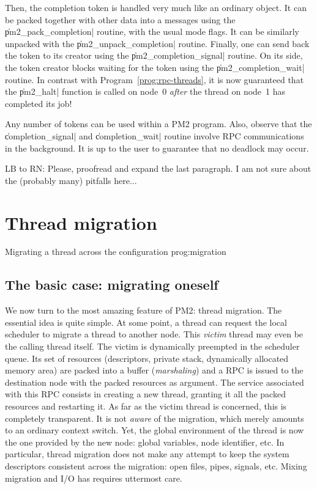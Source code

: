 Then, the completion token is handled very much like an ordinary
object. It can be packed together with other data into a messages
using the \|pm2_pack_completion| routine, with the usual mode flags.
It can be similarly unpacked with the \|pm2_unpack_completion|
routine.  Finally, one can send back the token to its creator using
the \|pm2_completion_signal| routine. On its side, the token creator
blocks waiting for the token using the \|pm2_completion_wait|
routine. In contrast with Program~\ref{prog:rpc-threads}, it is now
guaranteed that the \|pm2_halt| function is called on node~0
\emph{after} the thread on node~1 has completed its job!

Any number of tokens can be used within a PM2 program. Also, observe
that the \|completion_signal| and \|completion_wait| routine involve
RPC communications in the background. It is up to the user to
guarantee that no deadlock may occur.

\begin{note}
  LB to RN: Please, proofread and expand the last paragraph. I am not
  sure about the (probably many) pitfalls here...
\end{note}

\section{Thread migration}

 {Migrating a thread across the
  configuration} {prog:migration}

\subsection{The basic case: migrating oneself}
\label{sec:self-migration}

We now turn to the most amazing feature of PM2: thread migration. The
essential idea is quite simple. At some point, a thread can request
the local scheduler to migrate a thread to another node. This
\emph{victim} thread may even be the calling thread itself. The victim
is dynamically preempted in the scheduler queue. Its set of resources
(descriptors, private stack, dynamically allocated memory area) are
packed into a buffer (\emph{marshaling}) and a RPC is issued to the
destination node with the packed resources as argument.  The service
associated with this RPC consists in creating a new thread, granting
it all the packed resources and restarting it.  As far as the victim
thread is concerned, this is completely transparent.  It is not
\emph{aware} of the migration, which merely amounts to an ordinary
context switch.  Yet, the global environment of the thread is now the
one provided by the new node: global variables, node identifier, etc.
In particular, thread migration does not make any attempt to keep the
system descriptors consistent across the migration: open files, pipes,
signals, etc.  Mixing migration and I/O has requires uttermost care.

